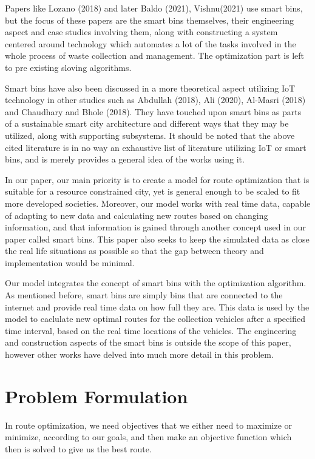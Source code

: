\documentclass[12pt]{article}
\begin{document}
Papers like Lozano (2018) and later Baldo (2021), Vishnu(2021) use smart bins, but the focus of these papers are the smart bins themselves, their engineering aspect and case studies involving them, along with constructing a system centered around technology which automates a lot of the tasks involved in the whole process of waste collection and management. The optimization part is left to pre existing sloving algorithms.

Smart bins have also been discussed in a more theoretical aspect utilizing IoT technology in other studies such as Abdullah (2018), Ali (2020), Al-Masri (2018) and Chaudhary and Bhole (2018). They have touched upon smart bins as parts of a sustainable smart city architecture and different ways that they may be utilized, along with supporting subsystems. It should be noted that the above cited literature is in no way an exhaustive list of literature utilizing IoT or smart bins, and is merely provides a general idea of the works using it.

In our paper, our main priority is to create a model for route optimization that is suitable for a resource constrained city, yet is general enough to be scaled to fit more developed societies. Moreover, our model works with real time data, capable of adapting to new data and calculating new routes based on changing information, and that information is gained through another concept used in our paper called smart bins. This paper also seeks to keep the simulated data as close the real life situations as possible so that the gap between theory and implementation would be minimal.

Our model integrates the concept of smart bins with the optimization algorithm. As mentioned before, smart bins are simply bins that are connected to the internet and provide real time data on how full they are. This data is used by the model to caclulate new optimal routes for the collection vehicles after a specified time interval, based on the real time locations of the vehicles. The engineering and construction aspects of the smart bins is outside the scope of this paper, however other works have delved into much more detail in this problem.

\section{Problem Formulation}

In route optimization, we need objectives that we either need to maximize or minimize, according to our goals, and then make an objective function which then is solved to give us the best route. 
\end{document}
